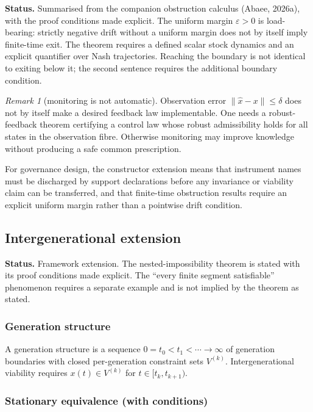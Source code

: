 \documentclass[preprint,11pt,authoryear]{elsarticle}
\theoremstyle{remark}
\newtheorem{remark}{Remark}
\begin{document}
\noindent\noindent\textbf{Status.} Summarised from the companion obstruction calculus (Abaee, 2026a), with the proof conditions made explicit. The uniform margin $\varepsilon > 0$ is load-bearing: strictly negative drift without a uniform margin does not by itself imply finite-time exit. The theorem requires a defined scalar stock dynamics and an explicit quantifier over Nash trajectories. Reaching the boundary is not identical to exiting below it; the second sentence requires the additional boundary condition.

\begin{remark}[monitoring is not automatic] Observation error $\|\hat x - x\| \le \delta$ does not by itself make a desired feedback law implementable. One needs a robust-feedback theorem certifying a control law whose robust admissibility holds for all states in the observation fibre. Otherwise monitoring may improve knowledge without producing a safe common prescription.\end{remark}

For governance design, the constructor extension means that instrument names must be discharged by support declarations before any invariance or viability claim can be transferred, and that finite-time obstruction results require an explicit uniform margin rather than a pointwise drift condition.

\subsection{Intergenerational extension}

\noindent\textbf{Status.} Framework extension. The nested-impossibility theorem is stated with its proof conditions made explicit. The ``every finite segment satisfiable'' phenomenon requires a separate example and is not implied by the theorem as stated.

\subsubsection{Generation structure}

A generation structure is a sequence $0 = t_0 < t_1 < \cdots \to \infty$ of generation boundaries with closed per-generation constraint sets $V^{(k)}$. Intergenerational viability requires $x(t) \in V^{(k)}$ for $t \in [t_k, t_{k+1})$.

\subsubsection{Stationary equivalence (with conditions)}
\end{document}
